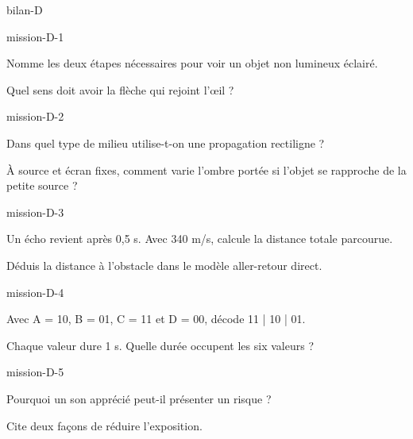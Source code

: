 \documentclass[12pt,twoside,openany]{book}
\begin{document}
\label{bilan-D}
\begin{pcFiche}{bilan-D}
\begin{blocLivre}{mission-D-1}
\begin{questions}
\item Nomme les deux étapes nécessaires pour voir un objet non lumineux éclairé.
\item Quel sens doit avoir la flèche qui rejoint l’œil ?
\end{questions}
\end{blocLivre}
\begin{blocLivre}{mission-D-2}
\begin{questions}
\item Dans quel type de milieu utilise-t-on une propagation rectiligne ?
\item À source et écran fixes, comment varie l’ombre portée si l’objet se rapproche de la petite source ?
\end{questions}
\end{blocLivre}
\begin{blocLivre}{mission-D-3}
\begin{questions}
\item Un écho revient après 0,5 s. Avec 340 m/s, calcule la distance totale parcourue.
\item Déduis la distance à l’obstacle dans le modèle aller-retour direct.
\end{questions}
\end{blocLivre}
\begin{blocLivre}{mission-D-4}
\begin{questions}
\item Avec A = 10, B = 01, C = 11 et D = 00, décode 11 | 10 | 01.
\item Chaque valeur dure 1 s. Quelle durée occupent les six valeurs ?
\end{questions}
\end{blocLivre}
\begin{blocLivre}{mission-D-5}
\begin{questions}
\item Pourquoi un son apprécié peut-il présenter un risque ?
\item Cite deux façons de réduire l’exposition.
\end{questions}
\end{blocLivre}
\end{pcFiche}
\end{document}
